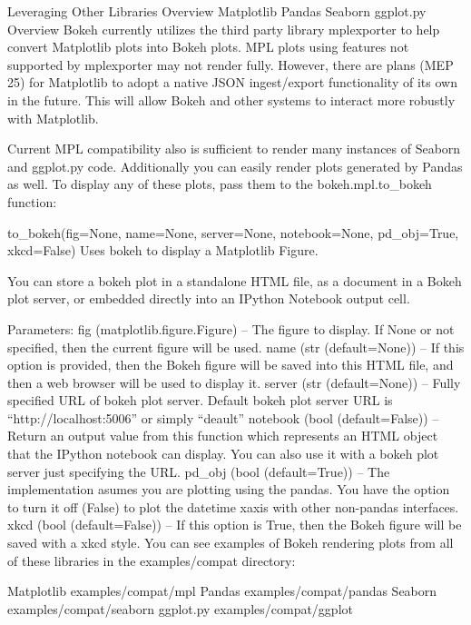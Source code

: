 Leveraging Other Libraries
Overview
Matplotlib
Pandas
Seaborn
ggplot.py
Overview
Bokeh currently utilizes the third party library mplexporter to help convert Matplotlib plots into Bokeh plots. MPL plots using features not supported by mplexporter may not render fully. However, there are plans (MEP 25) for Matplotlib to adopt a native JSON ingest/export functionality of its own in the future. This will allow Bokeh and other systems to interact more robustly with Matplotlib.

Current MPL compatibility also is sufficient to render many instances of Seaborn and ggplot.py code. Additionally you can easily render plots generated by Pandas as well. To display any of these plots, pass them to the bokeh.mpl.to_bokeh function:

to_bokeh(fig=None, name=None, server=None, notebook=None, pd_obj=True, xkcd=False)
Uses bokeh to display a Matplotlib Figure.

You can store a bokeh plot in a standalone HTML file, as a document in a Bokeh plot server, or embedded directly into an IPython Notebook output cell.

Parameters:	
fig (matplotlib.figure.Figure) – The figure to display. If None or not specified, then the current figure will be used.
name (str (default=None)) – If this option is provided, then the Bokeh figure will be saved into this HTML file, and then a web browser will be used to display it.
server (str (default=None)) – Fully specified URL of bokeh plot server. Default bokeh plot server URL is “http://localhost:5006” or simply “deault”
notebook (bool (default=False)) – Return an output value from this function which represents an HTML object that the IPython notebook can display. You can also use it with a bokeh plot server just specifying the URL.
pd_obj (bool (default=True)) – The implementation asumes you are plotting using the pandas. You have the option to turn it off (False) to plot the datetime xaxis with other non-pandas interfaces.
xkcd (bool (default=False)) – If this option is True, then the Bokeh figure will be saved with a xkcd style.
You can see examples of Bokeh rendering plots from all of these libraries in the examples/compat directory:

Matplotlib
examples/compat/mpl
Pandas
examples/compat/pandas
Seaborn
examples/compat/seaborn
ggplot.py
examples/compat/ggplot
